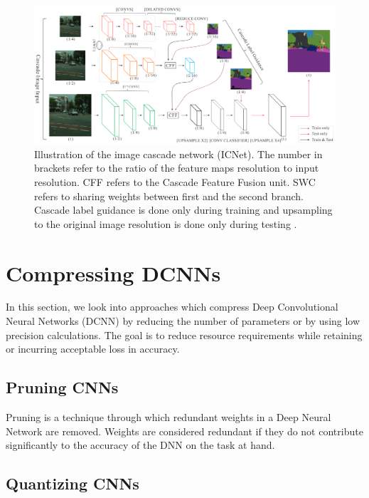	\begin{figure}
		\centering
		\includegraphics[width=1\linewidth]{images/icnet}
		\caption{Illustration of the image cascade network (ICNet). The number in brackets refer to the ratio of the feature maps resolution to input resolution. CFF refers to the Cascade Feature Fusion unit. SWC refers to sharing weights between first and the second branch. Cascade label guidance is done only during training and upsampling to the original image resolution is done only during testing \cite{DBLP:journals/corr/ZhaoQSSJ17}.}
		\label{Fig:icnet}
	\end{figure}

\section{Compressing DCNNs}
\label{section:compress}

In this section, we look into approaches which compress Deep Convolutional Neural Networks (DCNN) by reducing the number of parameters or by using low precision calculations. The goal is to reduce resource requirements while retaining or incurring acceptable loss in accuracy. 

\subsection{Pruning CNNs}

Pruning is a technique through which redundant weights in a Deep Neural Network are removed. Weights are considered redundant if they do not contribute significantly to the accuracy of the DNN on the task at hand. 

\subsection{Quantizing CNNs}



